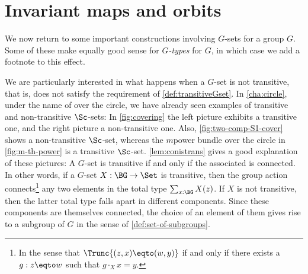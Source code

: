 


\section{Invariant maps and orbits}
\label{sec:fixpts-orbits}
We now return to some important constructions involving $G$-sets 
for a group $G$.
Some of these make equally good sense for \emph{$G$-types} for \aninftygp
$G$, in which case we add a footnote to this effect.

We are particularly interested in what happens when a $G$-set
is not transitive, that is, does not satisfy the requirement of 
\cref{def:transitiveGset}. In \cref{cha:circle}, under the name
of \coverings over the circle, we have already seen examples of
transitive and non-transitive $\Sc$-sets:
In \cref{fig:covering} the left picture exhibits a transitive one,
and the right picture  a non-transitive one. Also, 
\cref{fig:two-comp-S1-cover} shows a non-transitive $\Sc$-set,
whereas the $m$\th power bundle over the circle in
\cref{fig:m-th-power} is a transitive $\Sc$-set.
\cref{lem:conistrans} gives a good explanation of these pictures:
A $G$-set is transitive if and only if the associated \covering is connected.
In other words, if a $G$-set $X:\BG\to\Set$ is transitive, then the
group action connects\footnote{In the sense that $\Trunc{(z,x)\eqto(w,y)}$
if and only if there exists a $g:z\eqto w$ such that $g\cdot_X x = y$.} 
any two elements in the total type $\sum_{x:\BG} X(z)$.
If $X$ is not transitive, then the latter total type falls apart 
in different components. Since these components are themselves
connected, the choice of an element of them gives rise to a subgroup of $G$
in the sense of \cref{def:set-of-subgroups}.

